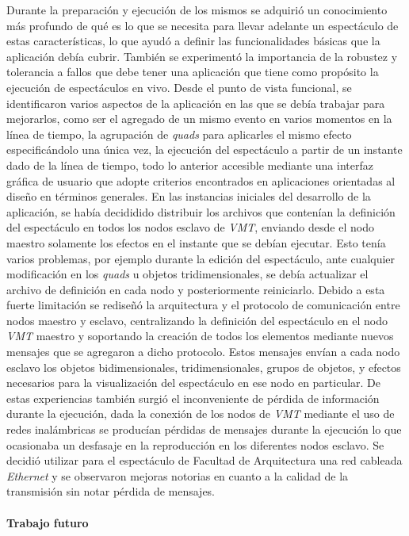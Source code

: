 Durante la preparación y ejecución de los mismos se adquirió un conocimiento más profundo de qué es lo que se necesita para llevar adelante un espectáculo de estas características, lo que ayudó a definir las funcionalidades básicas que la aplicación debía cubrir. También se experimentó la importancia de la robustez y tolerancia a fallos que debe tener una aplicación que tiene como propósito la ejecución de espectáculos en vivo.
Desde el punto de vista funcional, se identificaron varios aspectos de la aplicación en las que se debía trabajar para mejorarlos, como ser el agregado de un mismo evento en varios momentos en la línea de tiempo, la agrupación de \emph{quads} para aplicarles el mismo efecto especificándolo una única vez, la ejecución del espectáculo a partir de un instante dado de la línea de tiempo, todo lo anterior accesible mediante una interfaz gráfica de usuario que adopte criterios encontrados en aplicaciones orientadas al diseño en términos generales.
En las instancias iniciales del desarrollo de la aplicación, se había decididido distribuir los archivos que contenían la definición del espectáculo en todos los nodos esclavo de \emph{VMT}, enviando desde el nodo maestro solamente los efectos en el instante que se debían ejecutar. Esto tenía varios problemas, por ejemplo durante la edición del espectáculo, ante cualquier modificación en los \emph{quads} u objetos tridimensionales, se debía actualizar el archivo de definición en cada nodo y posteriormente reiniciarlo.
Debido a esta fuerte limitación se rediseñó la arquitectura y el protocolo de comunicación entre nodos maestro y esclavo, centralizando la definición del espectáculo en el nodo \emph{VMT} maestro y soportando la creación de todos los elementos mediante nuevos mensajes que se agregaron a dicho protocolo. Estos mensajes envían a cada nodo esclavo los objetos bidimensionales, tridimensionales, grupos de objetos, y efectos necesarios para la visualización del espectáculo en ese nodo en particular.
De estas experiencias también surgió el inconveniente de pérdida de información durante la ejecución, dada la conexión de los nodos de \emph{VMT} mediante el uso de redes inalámbricas se producían pérdidas de mensajes durante la ejecución lo que ocasionaba un desfasaje en la reproducción en los diferentes nodos esclavo. Se decidió utilizar para el espectáculo de Facultad de Arquitectura una red cableada \emph{Ethernet} y se observaron mejoras notorias en cuanto a la calidad de la transmisión sin notar pérdida de mensajes.

\paragraph{Trabajo futuro}

